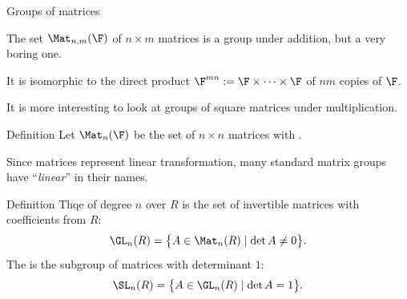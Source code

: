 \documentclass[8pt, handout]{beamer}
\newcommand{\Pause}{}
\begin{document}
\begin{frame}{Groups of matrices} %

  The set $\Mat_{n,m}(\F)$ of $n\times m$ matrices is a
  group under addition, but a very boring one. \medskip\Pause

  It is isomorphic to the direct product $\F^{mn}:=\F\times\cdots\times
  \F$ of $nm$ copies of $\F$. \medskip\Pause

  
  It is more interesting to look at groups of square matrices
  under multiplication.
  
  \Pause
  
  \begin{block}{Definition}
    Let $\Mat_n(\F)$ be the set of $n\times n$ matrices with
    .
  \end{block}
  
  
  \medskip\Pause
  
  Since matrices represent linear transformation, many standard matrix
  groups have ``\emph{linear}'' in their names.

  \medskip\Pause
  
  \begin{block}{Definition}
    Thqe  of degree $n$ over $R$ is the
    set of invertible matrices with coefficients from $R$:
    \[
    \GL_n(R)=\big\{A\in\Mat_n(R)\mid \det A\neq 0\big\}. 
    \]
    \Pause The  is the subgroup of matrices with
    determinant $1$:
    \[
    \SL_n(R)=\big\{A\in\GL_n(R)\mid\det A=1\big\}.
    \]
  \end{block}

\end{frame}


\end{document}
